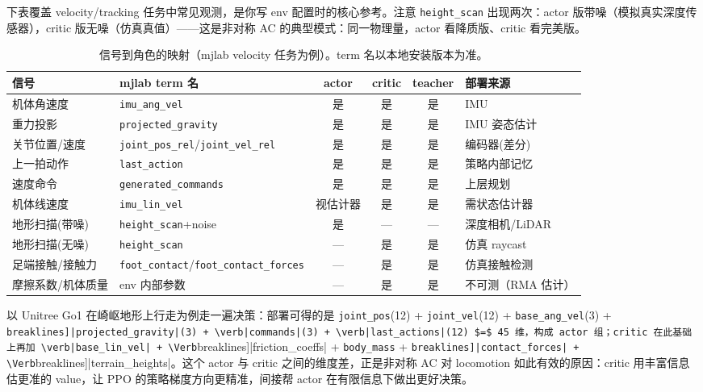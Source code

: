 下表覆盖 velocity/tracking 任务中常见观测，是你写 env 配置时的核心参考。注意 \verb|height_scan| 出现两次：actor 版带噪（模拟真实深度传感器），critic 版无噪（仿真真值）——这是非对称 AC 的典型模式：同一物理量，actor 看降质版、critic 看完美版。

\begin{table}[H]
\centering
\small
\caption{信号到角色的映射（mjlab velocity 任务为例）。term 名以本地安装版本为准。}
\label{tab:rlmc-priv-mapping}
\begin{tabular}{@{}p{2.7cm}p{3.0cm}cccp{2.6cm}@{}}
\toprule
信号 & mjlab term 名 & actor & critic & teacher & 部署来源 \\
\midrule
机体角速度 & \texttt{imu\_ang\_vel} & 是 & 是 & 是 & IMU \\
重力投影 & \texttt{projected\_gravity} & 是 & 是 & 是 & IMU 姿态估计 \\
关节位置/速度 & \texttt{joint\_pos\_rel}/\allowbreak\texttt{joint\_vel\_rel} & 是 & 是 & 是 & 编码器(差分) \\
上一拍动作 & \texttt{last\_action} & 是 & 是 & 是 & 策略内部记忆 \\
速度命令 & \texttt{generated\_commands} & 是 & 是 & 是 & 上层规划 \\
机体线速度 & \texttt{imu\_lin\_vel} & 视估计器 & 是 & 是 & 需状态估计器 \\
地形扫描(带噪) & \texttt{height\_scan}+noise & 是 & --- & --- & 深度相机/LiDAR \\
地形扫描(无噪) & \texttt{height\_scan} & --- & 是 & 是 & 仿真 raycast \\
足端接触/接触力 & \texttt{foot\_contact}/\allowbreak\texttt{foot\_contact\_forces} & --- & 是 & 是 & 仿真接触检测 \\
摩擦系数/机体质量 & env 内部参数 & --- & 是 & 是 & 不可测（RMA 估计） \\
\bottomrule
\end{tabular}
\end{table}

以 Unitree Go1 在崎岖地形上行走为例走一遍决策：部署可得的是 \verb|joint_pos|(12) + \verb|joint_vel|(12) + \verb|base_ang_vel|(3) + \Verb[breaklines]|projected_gravity|(3) + \verb|commands|(3) + \verb|last_actions|(12) $=$ 45 维，构成 actor 组；critic 在此基础上再加 \verb|base_lin_vel| + \Verb[breaklines]|friction_coeffs| + \verb|body_mass| + \Verb[breaklines]|contact_forces| + \Verb[breaklines]|terrain_heights|。这个 actor 与 critic 之间的维度差，正是非对称 AC 对 locomotion 如此有效的原因：critic 用丰富信息估更准的 value，让 PPO 的策略梯度方向更精准，间接帮 actor 在有限信息下做出更好决策。

